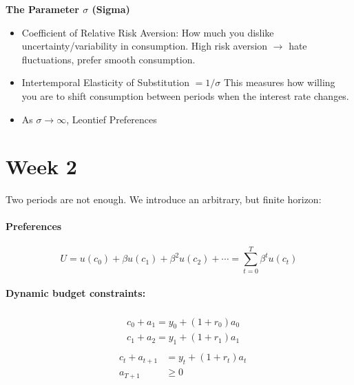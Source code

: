 \documentclass[12pt]{article}
\begin{document}
\textbf{The Parameter $\sigma$ (Sigma)}

\begin{itemize}
    \item Coefficient of Relative Risk Aversion: How much you dislike uncertainty/variability in consumption. High risk aversion $\rightarrow$ hate fluctuations, prefer smooth consumption.
    \item Intertemporal Elasticity of Substitution $=1 / \sigma$ This measures how willing you are to shift consumption between periods when the interest rate changes.
    \item As $\sigma \rightarrow \infty$, Leontief Preferences
\end{itemize}

\section{Week 2}

Two periods are not enough. We introduce an arbitrary, but finite horizon:
\paragraph{Preferences}
$$
U=u\left(c_0\right)+\beta u\left(c_1\right)+\beta^2 u\left(c_2\right)+\cdots=\sum_{t=0}^T \beta^t u\left(c_t\right)
$$
\paragraph{Dynamic budget constraints:}
$$
\begin{aligned}
&\begin{aligned}
& c_0+a_1=y_0+\left(1+r_0\right) a_0 \\
& c_1+a_2=y_1+\left(1+r_1\right) a_1
\end{aligned}\\
&\begin{aligned}
c_t+a_{t+1} & =y_t+\left(1+r_t\right) a_t \\
a_{T+1} & \geq 0
\end{aligned}
\end{aligned}
$$
\end{document}
